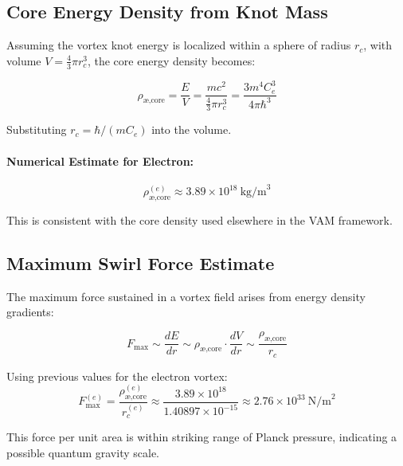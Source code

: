 \documentclass[a4paper,12pt]{article}
\begin{document}
        \subsection{ Core Energy Density from Knot Mass}

        Assuming the vortex knot energy is localized within a sphere of radius $r_c$, with volume $V = \frac{4}{3} \pi r_c^3$, the core energy density becomes:

        \begin{equation}
        \rho_{\text{\ae,core}} = \frac{E}{V} = \frac{m c^2}{\frac{4}{3} \pi r_c^3} = \frac{3 m^4 C_e^3}{4 \pi \hbar^3}
        \end{equation}

        Substituting $r_c = \hbar / (m C_e)$ into the volume.


        \paragraph{Numerical Estimate for Electron:}
        \begin{equation}
        \rho_{\text{\ae,core}}^{(e)} \approx 3.89 \times 10^{18} \ \text{kg/m}^3
        \end{equation}

        This is consistent with the core density used elsewhere in the VAM framework.

        \subsection{ Maximum Swirl Force Estimate}
        The maximum force sustained in a vortex field arises from energy density gradients:

        \begin{equation}
        F_{\max} \sim \frac{dE}{dr} \sim \rho_{\text{\ae,core}} \cdot \frac{dV}{dr} \sim \frac{\rho_{\text{\ae,core}}}{r_c}
        \end{equation}

        Using previous values for the electron vortex:
        \begin{equation}
        F_{\max}^{(e)} = \frac{\rho_{\text{\ae,core}}^{(e)}}{r_c^{(e)}} \approx \frac{3.89 \times 10^{18}}{1.40897 \times 10^{-15}} \approx 2.76 \times 10^{33} \ \text{N/m}^2
        \end{equation}

        This force per unit area is within striking range of Planck pressure, indicating a possible quantum gravity scale.
\end{document}
